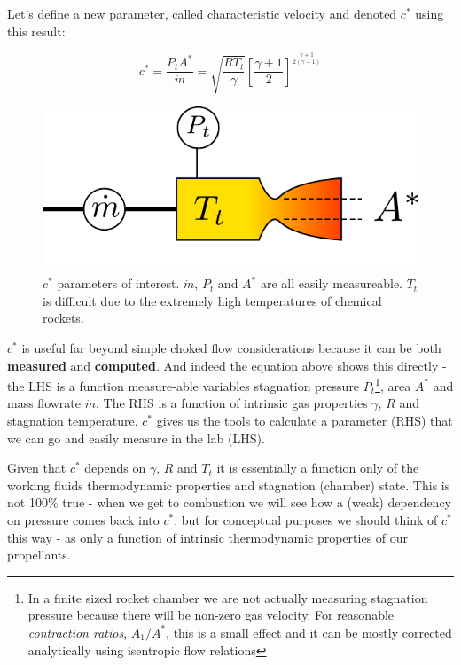 \documentclass[twocolumn]{memoir} %
\begin{document}
Let's define a new parameter, called characteristic velocity and denoted
$c^{*}$ using this result:

\begin{equation}c^* = \frac{P_t A^*}{\dot{m}} = \sqrt{\frac{R T_t}{\gamma}}\left[\frac{\gamma + 1}{2}\right]^{\frac{\gamma + 1}{2(\gamma - 1)}}
    \label{eq:cstar}
\end{equation}

\begin{figure}[H]
    \includegraphics[width=0.9\columnwidth]{cstar_diagram}
    \caption{$c^*$ parameters of interest.  $\dot{m}$, $P_t$ and $A^*$ are all easily 
    measureable.  $T_t$ is difficult due to the extremely high temperatures of chemical
    rockets.}
\end{figure}

$c^*$ is useful far beyond simple choked flow considerations because
it can be both \textbf{measured} and \textbf{computed}. And indeed the
equation above shows this directly - the LHS is a function 
measure-able variables stagnation pressure $P_t$\footnote{In a finite sized rocket chamber we are not actually measuring stagnation pressure because there will be non-zero gas velocity.  For reasonable \emph{contraction ratios}, $A_1/A^*$, this is a small effect and it can be mostly corrected analytically using isentropic flow relations}, area $A^*$ and mass flowrate $\dot{m}$. The RHS is a
function of intrinsic gas properties $\gamma$, $R$ and stagnation
temperature. $c^*$ gives us the tools to calculate a parameter (RHS)
that we can go and easily measure in the lab (LHS).

Given that $c^*$ depends on $\gamma$, $R$ and $T_t$ it is essentially a function only of the working fluids thermodynamic properties and stagnation (chamber) state.  This is not 100\% true - when we get to combustion we will see how a (weak) dependency on pressure comes back into $c^*$, but for conceptual purposes we should think of $c^*$ this way - as only a function of intrinsic thermodynamic properties of our propellants.
\end{document}
